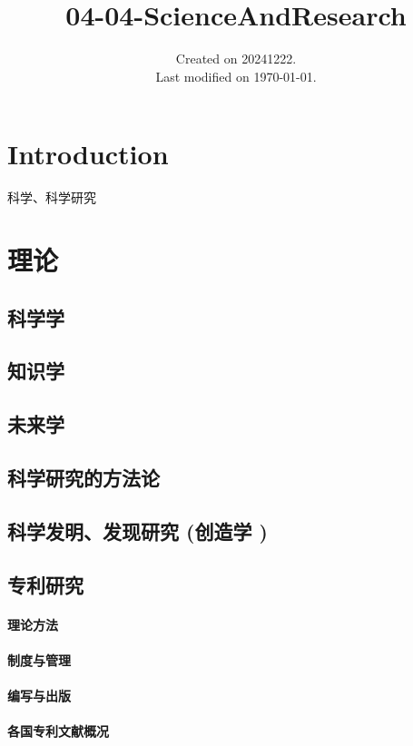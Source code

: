 \documentclass[UTF8]{../../ApplicationUniverse}
\begin{document}
\title{04-04-ScienceAndResearch}
\date{Created on 20241222.\\   Last modified on \today.}
\maketitle
\tableofcontents


\chapter{Introduction}

科学、科学研究



\chapter{理论}
\section{科学学}
\section{知识学}
\section{未来学}
\section{科学研究的方法论}
\section{科学发明、发现研究 (创造学 )}
\section{专利研究}
    \subsubsection{理论方法}
    \subsubsection{制度与管理}
    \subsubsection{编写与出版}
    \subsubsection{各国专利文献概况}
\end{document}
